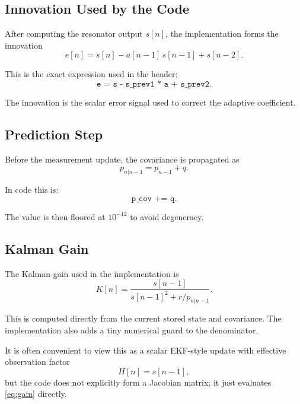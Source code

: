 \documentclass[conference]{IEEEtran}
\begin{document}
\subsection{Innovation Used by the Code}

After computing the resonator output $s[n]$, the implementation forms the
innovation
\begin{equation}\label{eq:innovation}
  e[n] = s[n] - a[n-1]\,s[n-1] + s[n-2].
\end{equation}

This is the exact expression used in the header:
\begin{equation}
  \texttt{e = s - s\_prev1 * a + s\_prev2}.
\end{equation}

The innovation is the scalar error signal used to correct the adaptive
coefficient.

\subsection{Prediction Step}

Before the measurement update, the covariance is propagated as
\begin{equation}\label{eq:pred}
  p_{n|n-1} = p_{n-1} + q.
\end{equation}

In code this is:
\begin{equation}
  \texttt{p\_cov += q}.
\end{equation}

The value is then floored at $10^{-12}$ to avoid degeneracy.

\subsection{Kalman Gain}

The Kalman gain used in the implementation is
\begin{equation}\label{eq:gain}
  K[n] = \frac{s[n-1]}{s[n-1]^2 + r/p_{n|n-1}}.
\end{equation}

This is computed directly from the current stored state and covariance.
The implementation also adds a tiny numerical guard to the denominator.

It is often convenient to view this as a scalar EKF-style update with
effective observation factor
\begin{equation}
  H[n] = s[n-1],
\end{equation}
but the code does not explicitly form a Jacobian matrix; it just evaluates
\eqref{eq:gain} directly.
\end{document}
